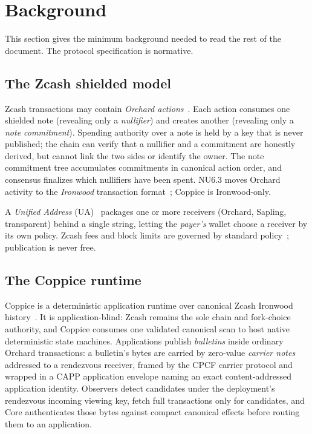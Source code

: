 \documentclass[11pt]{article}
\begin{document}
\section{Background}
\label{sec:background}

This section gives the minimum background needed to read the rest of the
document. The protocol specification is normative.

\subsection{The Zcash shielded model}

Zcash transactions may contain \emph{Orchard actions}~\cite{zip229}. Each
action consumes one shielded note (revealing only a \emph{nullifier}) and
creates another (revealing only a \emph{note commitment}). Spending authority
over a note is held by a key that is never published; the chain can verify
that a nullifier and a commitment are honestly derived, but cannot link the
two sides or identify the owner. The note commitment tree accumulates
commitments in canonical action order, and consensus finalizes which
nullifiers have been spent. NU6.3 moves Orchard activity to the \emph{Ironwood}
transaction format~\cite{zip258,zip318,zip326}; Coppice is Ironwood-only.

A \emph{Unified Address} (UA)~\cite{zip316} packages one or more receivers
(Orchard, Sapling, transparent) behind a single string, letting the
\emph{payer's} wallet choose a receiver by its own policy. Zcash fees and
block limits are governed by standard policy~\cite{zip317}; publication is
never free.

\subsection{The Coppice runtime}

Coppice is a deterministic application runtime over canonical Zcash Ironwood
history~\cite{coppice}. It is application-blind: Zcash remains the sole chain
and fork-choice authority, and Coppice consumes one validated canonical scan
to host native deterministic state machines. Applications publish
\emph{bulletins} inside ordinary Orchard transactions: a bulletin's bytes are
carried by zero-value \emph{carrier notes} addressed to a rendezvous
receiver, framed by the CPCF carrier protocol and wrapped in a CAPP
application envelope naming an exact content-addressed application identity. Observers
detect candidates under the deployment's rendezvous incoming viewing key,
fetch full transactions only for candidates, and Core authenticates those
bytes against compact canonical effects before routing them to an application.
\end{document}

